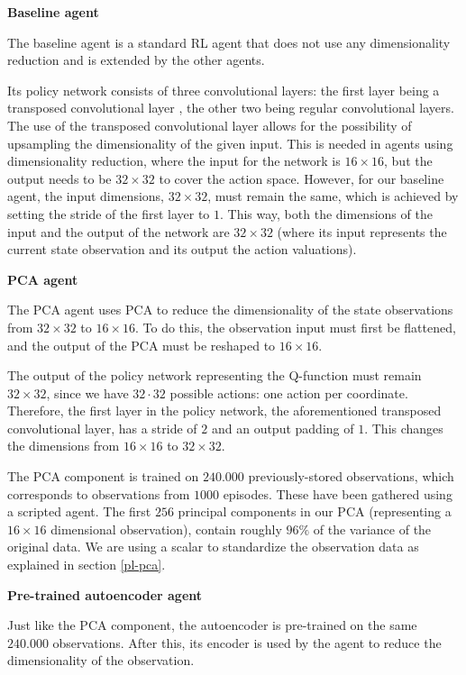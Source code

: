 \noindent \textbf{Baseline agent}\par
\noindent The baseline agent is a standard RL agent that does not use any dimensionality reduction and is extended by the other agents.

Its policy network consists of three convolutional layers: the first layer being a transposed convolutional layer \cite{transpose}, the other two being regular convolutional layers. The use of the transposed convolutional layer allows for the possibility of upsampling the dimensionality of the given input. This is needed in agents using dimensionality reduction, where the input for the network is $16 \times 16$, but the output needs to be $32 \times 32$ to cover the action space. However, for our baseline agent, the input dimensions, $32 \times 32$, must remain the same, which is achieved by setting the stride of the first layer to $1$. This way, both the dimensions of the input and the output of the network are $32 \times 32$ (where its input represents the current state observation and its output the action valuations).\newline\par

\noindent \textbf{PCA agent}\par
\noindent The PCA agent uses PCA to reduce the dimensionality of the state observations from $32 \times 32$ to $16 \times 16$. To do this, the observation input must first be flattened, and the output of the PCA must be reshaped to $16 \times 16$.

The output of the policy network representing the Q-function must remain $32 \times 32$, since we have $32 \cdot 32$ possible actions: one action per coordinate. Therefore, the first layer in the policy network, the aforementioned transposed convolutional layer, has a stride of $2$ and an output padding of $1$. This changes the dimensions from $16 \times 16$ to $32 \times 32$. 

The PCA component is trained on $240.000$ previously-stored observations, which corresponds to observations from $1000$ episodes. These have been gathered using a scripted agent. The first $256$ principal components in our PCA (representing a $16 \times 16$ dimensional observation), contain roughly $96\%$ of the variance of the original data. We are using a scalar to standardize the observation data as explained in section \ref{pl-pca}. \newline\par

\noindent \textbf{Pre-trained autoencoder agent}\par
\noindent Just like the PCA component, the autoencoder is pre-trained on the same $240.000$ observations. After this, its encoder is used by the agent to reduce the dimensionality of the observation. 

